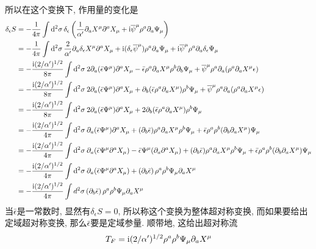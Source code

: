 \begin{framed}
所以在这个变换下, 作用量的变化是\begin{align*}
\delta _{\epsilon }S &=-\frac{1}{4\pi }\int \dif^{2}\sigma\, \delta _{\epsilon
}\left( \frac{1}{\alpha ^{\prime }}\partial _{a}X^{\mu }\partial ^{a}X_{\mu
}+\mi\overline{\psi}^{\mu }\rho ^{a}\partial _{a}\Psi _{\mu }\right)  \\
&=-\frac{1}{4\pi }\int \dif^{2}\sigma\, \frac{2}{\alpha ^{\prime }}\partial
_{a}\delta _{\epsilon }X^{\mu }\partial ^{a}X_{\mu }+\mi(\delta _{\epsilon }%
\overline{\psi}^{\mu })\rho ^{a}\partial _{a}\Psi _{\mu }+\mi\overline{\psi}^{\mu }\rho
^{a}\partial _{a}\delta _{\epsilon }\Psi _{\mu } \\
&=-\frac{\mi(2/\alpha ^{\prime })^{1/2}}{8\pi }\int \dif^{2}\sigma\: 2\partial
_{a}(\bar{\epsilon}\Psi ^{\mu }) \partial ^{a}X_{\mu }-\bar{%
\epsilon}\rho ^{a}\partial _{a}X^{\mu }\rho ^{b}\partial _{b}\Psi _{\mu }+%
\overline{\psi}^{\mu }\rho ^{a}\partial _{a}( \rho ^{a}\partial _{a}X^{\mu
}\epsilon)  \\
&=-\frac{\mi(2/\alpha ^{\prime })^{1/2}}{8\pi }\int \dif^{2}\sigma\:2\partial
_{a}( \bar{\epsilon}\Psi ^{\mu }) \partial ^{a}X_{\mu }+\partial
_{b}( \bar{\epsilon}\rho ^{a}\partial _{a}X^{\mu }) \rho ^{b}\Psi
_{\mu }+\overline{\psi}^{\mu }\rho ^{a}\partial _{a}( \rho ^{a}\partial
_{a}X^{\mu }\epsilon )  \\
&=-\frac{\mi(2/\alpha ^{\prime })^{1/2}}{8\pi }\int \dif^{2}\sigma \:2\partial
_{a}(\bar{\epsilon}\Psi ^{\mu }) \partial ^{a}X_{\mu }+2\partial
_{b}(\bar{\epsilon}\rho ^{a}\partial _{a}X^{\mu }) \rho ^{b}\Psi
_{\mu } \\
&=-\frac{\mi(2/\alpha ^{\prime })^{1/2}}{4\pi }\int \dif^{2}\sigma\: \partial
_{a}(\bar{\epsilon}\Psi ^{\mu }) \partial ^{a}X_{\mu }+(
\partial _{b}\bar{\epsilon}) \rho ^{a}\partial _{a}X^{\mu }\rho
^{b}\Psi _{\mu }+\bar{\epsilon}\rho ^{a}\rho ^{b}(\partial
_{b}\partial _{a}X^{\mu }) \Psi _{\mu } \\
&=-\frac{\mi(2/\alpha ^{\prime })^{1/2}}{4\pi }\int \dif^{2}\sigma\: \partial
_{a}( \bar{\epsilon}\Psi ^{\mu }\partial ^{a}X_{\mu }) -\bar{%
\epsilon}\Psi ^{\mu }( \partial _{a}\partial ^{a}X_{\mu })
+( \partial _{b}\bar{\epsilon}) \rho ^{a}\partial _{a}X^{\mu
}\rho ^{b}\Psi _{\mu }+\bar{\epsilon}\rho ^{a}\rho ^{b}( \partial
_{b}\partial _{a}X^{\mu }) \Psi _{\mu } \\
&=-\frac{\mi(2/\alpha ^{\prime })^{1/2}}{4\pi }\int \dif^{2}\sigma\: \partial
_{a}( \bar{\epsilon}\Psi ^{\mu }\partial ^{a}X_{\mu }) +\left(
\partial _{b}\bar{\epsilon}\right) \rho ^{a}\rho ^{b}\Psi _{\mu }\partial
_{a}X^{\mu } \\
&=-\frac{\mi(2/\alpha ^{\prime })^{1/2}}{4\pi }\int d^{2}\sigma \left(
\partial _{b}\bar{\epsilon}\right) \rho ^{a}\rho ^{b}\Psi _{\mu }\partial
_{a}X^{\mu }
\end{align*}
当$\bar{\epsilon}$是一常数时, 显然有$\delta_{\epsilon}S=0$, 所以称这个变换为整体超对称变换, 而如果要给出定域超对称变换, 那么$\bar{\epsilon}$要是定域参量. 顺带地, 这给出超对称流
\[
T_{F}=\mathrm{i}(2/\alpha ^{\prime })^{1/2} \rho ^{a}\rho ^{b}\Psi _{\mu }\partial_{a}X^{\mu }
\]

\end{framed}

